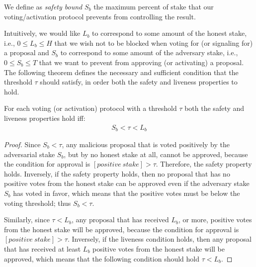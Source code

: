 \begin{definition}\label{def:safety-bound}
	We define as \emph{safety bound} $S_b$ the maximum percent of 
	stake that our voting/activation protocol prevents from controlling the 
	result.
\end{definition}

Intuitively, we would like $L_b$ to correspond to some amount of the honest 
stake, i.e., $0 \leq L_b \leq H$ that we wish not to be blocked when voting for 
(or signaling for) 
a proposal and $S_b$ to correspond to some amount of the 
adversary stake, i.e., $0 \leq S_b \leq T$ that we want to prevent from 
approving (or activating) a proposal. The following theorem defines the 
necessary and 
sufficient condition that the threshold $\tau$ should satisfy, in order both 
the safety and liveness properties to hold.

\begin{theorem}\label{th:safety_and_liveness_condition}
	For each voting (or activation) protocol with a threshold $\tau$ 
	both the safety and liveness properties hold iff:
	\begin{align*} 
		S_b < \tau < L_b 
	\end{align*}
	\begin{proof}
		Since $S_b < \tau$, any malicious proposal that is voted positively by 
		the adversarial stake $S_b$, but by no honest stake at all, cannot be 
		approved, because the condition for approval is $[positive\ stake] > 
		\tau$. Therefore, the safety property holds. Inversely, if the safety 
		property holds, then no proposal that has no positive votes from the 
		honest stake can be approved even if the adversary stake $S_b$ has 
		voted in favor, which means that the positive votes must be below the 
		voting threshold; thus $S_b < \tau$. 
		
		Similarly, since $\tau < L_b$, any proposal that has 
		received $L_b$, or more, positive votes from the honest stake will be 
		approved, because the condition for approval is $[positive\ stake] > 
		\tau$. Inversely, if the liveness condition holds, then any proposal 
		that has received at least $L_b$ positive votes from the honest stake 
		will be approved, which means that the following 
		condition should hold $\tau < L_b$.
	\end{proof}
\end{theorem}

